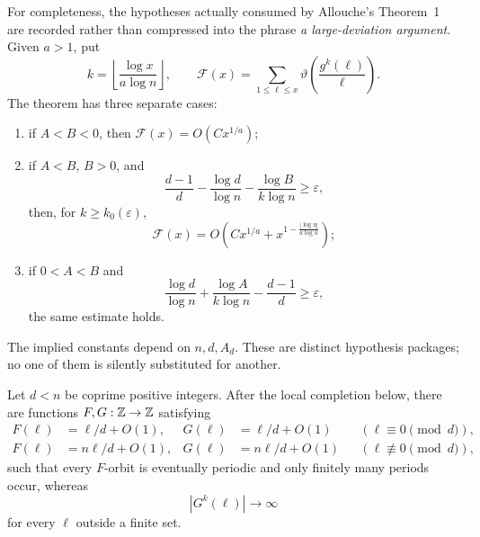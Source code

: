 For completeness, the hypotheses actually consumed by Allouche's
Theorem~1 are recorded rather than compressed into the phrase
\emph{a large-deviation argument}.  Given \(a>1\), put
\[
 k=\left\lfloor\frac{\log x}{a\log n}\right\rfloor,
 \qquad
 \mathcal F(x)=
 \sum_{1\le\ell\le x}
 \vartheta\left(\frac{g^k(\ell)}{\ell}\right).
\]
The theorem has three separate cases:
\begin{enumerate}
\item if \(A<B<0\), then \(\mathcal F(x)=O(Cx^{1/a})\);
\item if \(A<B\), \(B>0\), and
\[
 \frac{d-1}{d}-\frac{\log d}{\log n}
 -\frac{\log B}{k\log n}\ge\varepsilon,
\]
then, for \(k\ge k_0(\varepsilon)\),
\[
 \mathcal F(x)=
 O\left(Cx^{1/a}+x^{1-\frac{|\log\eta|}{a\log n}}\right);
\]
\item if \(0<A<B\) and
\[
 \frac{\log d}{\log n}+\frac{\log A}{k\log n}
 -\frac{d-1}{d}\ge\varepsilon,
\]
the same estimate holds.
\end{enumerate}
The implied constants depend on \(n,d,A_d\).  These are distinct
hypothesis packages; no one of them is silently substituted for another.

\begin{theorem}
\label{thm:Allouche-slope-obstruction}
Let \(d<n\) be coprime positive integers.  After the local completion below,
there are functions \(F,G:\mathbb{Z}\to\mathbb{Z}\) satisfying
\begin{align*}
 F(\ell)&=\ell/d+O(1),&G(\ell)&=\ell/d+O(1)
 &&(\ell\equiv0\pmod d),\\
 F(\ell)&=n\ell/d+O(1),&G(\ell)&=n\ell/d+O(1)
 &&(\ell\not\equiv0\pmod d),
\end{align*}
such that every \(F\)-orbit is eventually periodic and only finitely many
periods occur, whereas
\[
 |G^k(\ell)|\longrightarrow\infty
\]
for every \(\ell\) outside a finite set.
\end{theorem}

